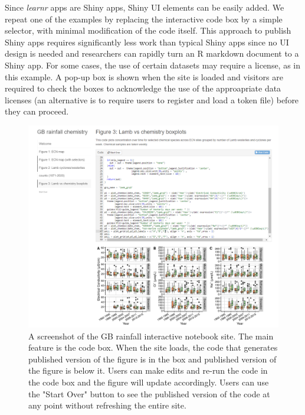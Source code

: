 Since \emph{learnr} apps are Shiny apps, Shiny UI elements can be easily
added. We repeat one of the examples by replacing the interactive code
box by a simple selector, with minimal modification of the code itself.
This approach to publish Shiny apps requires significantly less work
than typical Shiny apps since no UI design is needed and researchers can
rapidly turn an R markdown document to a Shiny app. For some cases, the
use of certain datasets may require a license, as in this example. A
pop-up box is shown when the site is loaded and visitors are required to
check the boxes to acknowledge the use of the approapriate data licenses
(an alternative is to require users to register and load a token file)
before they can proceed.

\begin{Schunk}
\begin{figure}
\includegraphics[width=\textwidth]{GB_notebook_screenshot} \caption[A screenshot of the GB rainfall interactive notebook site]{A screenshot of the GB rainfall interactive notebook site. The main feature is the code box. When the site loads, the code that generates published version of the figure is in the box and published version of the figure is below it. Users can make edits and re-run the code in the code box and the figure will update accordingly. Users can use the "Start Over" button to see the published version of the code at any point without refreshing the entire site.}\label{fig:fig2}
\end{figure}
\end{Schunk}

